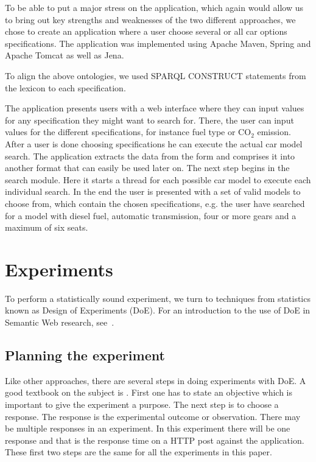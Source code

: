 \documentclass{llncs}
\begin{document}
To be able to put a major stress on the application, which again would
allow us to bring out key strengths and weaknesses of the two
different approaches, we chose to create an application where a user
choose several or all car options specifications. The application was
implemented using Apache Maven, Spring and Apache Tomcat as well as
Jena.

To align the above ontologies, we used SPARQL CONSTRUCT statements
from the lexicon to each specification.

The application presents users with a web interface where they can
input values for any specification they might want to search
for. There, the user can input values for the different specifications,
for instance fuel type or CO$_2$ emission. After a user is done
choosing specifications he can execute the actual car model
search. The application extracts the data from the form and comprises
it into another format that can easily be used later on. The next step
begins in the search module. Here it starts a thread for each possible
car model to execute each individual search. In the end the user is
presented with a set of valid models to choose from, which contain the
chosen specifications, e.g. the user have searched for a model with
diesel fuel, automatic transmission, four or more gears and a maximum
of six seats.


\section{Experiments}\label{Results}

To perform a statistically sound experiment, we turn to techniques
from statistics known as Design of Experiments (DoE). For an
introduction to the use of DoE in Semantic Web research, see~\cite{Kjern}.

\subsection{Planning the experiment}
Like other approaches, there are several steps in doing experiments
with DoE. A good textbook on the subject is \cite{PlanExp}. First one
has to state an objective which is important to give the experiment a
purpose.  The next step is to choose a response. The response is the
experimental outcome or observation. There may be multiple responses
in an experiment. In this experiment there will be one response and
that is the response time on a HTTP post against the application.
These first two steps are the same for all the experiments in this
paper.
\end{document}
